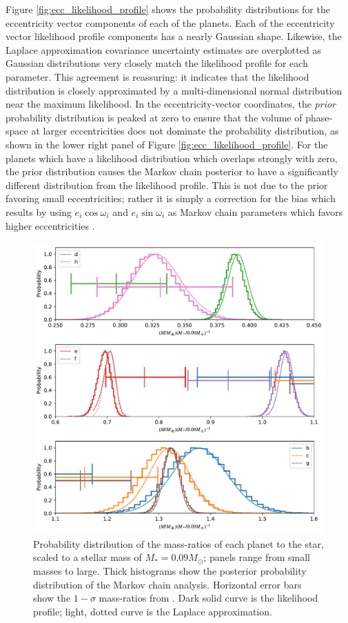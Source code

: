 \documentclass[twocolumn]{aastex63}
\begin{document}
Figure \ref{fig:ecc_likelihood_profile} shows the probability distributions
for the eccentricity vector components of each of the planets.
Each of the eccentricity vector likelihood profile components 
has a nearly Gaussian
shape.  Likewise, the Laplace approximation covariance uncertainty estimates are overplotted as
Gaussian distributions very closely match the likelihood profile
for each parameter.  This agreement is reassuring:  it indicates
that the likelihood distribution is closely approximated by
a multi-dimensional normal distribution near the maximum likelihood.   
In the eccentricity-vector coordinates,
the {\it prior} probability distribution is peaked
at zero to ensure that the volume of phase-space at larger
eccentricities does not dominate the probability distribution,
as shown in the lower right panel of Figure \ref{fig:ecc_likelihood_profile}.  
For the planets which have
a likelihood distribution which overlaps strongly with zero,
the prior distribution causes the Markov chain posterior to
have a significantly different distribution from the likelihood profile.  This is not
due to the prior favoring small eccentricities;  rather it is simply
a correction for the bias which results by using $e_i\cos{\omega_i}$
and $e_i\sin{\omega_i}$ as Markov chain parameters which favors
higher eccentricities \citep{Ford2006}.

\begin{figure}
    \centering
    \includegraphics[width=\hsize]{figures/T1_masses_03312020.pdf}
    \caption{Probability distribution of the mass-ratios of each planet to the star, scaled to a stellar mass of $M_*  = 0.09 M_\odot$; panels range from small masses to large.   Thick
    histograms show the posterior probability distribution of the Markov chain analysis.
    Horizontal error bars show the $1-\sigma$ mass-ratios from \citet{Grimm2018}.
    Dark solid curve is the likelihood profile; light, dotted curve is the Laplace approximation.}
    \label{fig:mass_likelihood_profile}
\end{figure}
\end{document}
